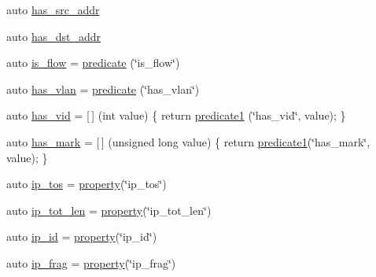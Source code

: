 \begin{DoxyCompactItemize}
\item 
auto \hyperlink{namespacepfq__lang_1_1anonymous__namespace_02default_8hpp_03_aabc75799de679df702f4179ead82114c}{has\+\_\+src\+\_\+addr}
\item 
auto \hyperlink{namespacepfq__lang_1_1anonymous__namespace_02default_8hpp_03_af223a0513ceffa69c0b8535a7cca12da}{has\+\_\+dst\+\_\+addr}
\item 
auto \hyperlink{namespacepfq__lang_1_1anonymous__namespace_02default_8hpp_03_a32aab6804e2daac2458f7c050ed69cf1}{is\+\_\+flow} = \hyperlink{namespacepfq__lang_abd58b2244ff8b0775a3b5865bc128872}{predicate} (\char`\"{}is\+\_\+flow\char`\"{})
\item 
auto \hyperlink{namespacepfq__lang_1_1anonymous__namespace_02default_8hpp_03_a30a0c8d9bcd28cd17c6c1699c3339c3f}{has\+\_\+vlan} = \hyperlink{namespacepfq__lang_abd58b2244ff8b0775a3b5865bc128872}{predicate} (\char`\"{}has\+\_\+vlan\char`\"{})
\item 
auto \hyperlink{namespacepfq__lang_1_1anonymous__namespace_02default_8hpp_03_adddd2dea56164719f2853af158911a80}{has\+\_\+vid} = \mbox{[}$\,$\mbox{]} (int value) \{ return \hyperlink{namespacepfq__lang_ae23a03cee94b5ddfde4a8d2e5c521f0e}{predicate1} (\char`\"{}has\+\_\+vid\char`\"{}, value); \}
\item 
auto \hyperlink{namespacepfq__lang_1_1anonymous__namespace_02default_8hpp_03_a0f9dc3f39bf9793e766b6312718483f1}{has\+\_\+mark} = \mbox{[}$\,$\mbox{]} (unsigned long value) \{ return \hyperlink{namespacepfq__lang_ae23a03cee94b5ddfde4a8d2e5c521f0e}{predicate1}(\char`\"{}has\+\_\+mark\char`\"{}, value); \}
\item 
auto \hyperlink{namespacepfq__lang_1_1anonymous__namespace_02default_8hpp_03_afc29e9877341008196788bba2bde3e04}{ip\+\_\+tos} = \hyperlink{namespacepfq__lang_ad70b40071ed0fd32c05ab8e82bbfec61}{property}(\char`\"{}ip\+\_\+tos\char`\"{})
\item 
auto \hyperlink{namespacepfq__lang_1_1anonymous__namespace_02default_8hpp_03_a172d424ed5943dda09a80d7c63be9490}{ip\+\_\+tot\+\_\+len} = \hyperlink{namespacepfq__lang_ad70b40071ed0fd32c05ab8e82bbfec61}{property}(\char`\"{}ip\+\_\+tot\+\_\+len\char`\"{})
\item 
auto \hyperlink{namespacepfq__lang_1_1anonymous__namespace_02default_8hpp_03_a7e1fd2e2131451ca8afe2f8ab07b97a8}{ip\+\_\+id} = \hyperlink{namespacepfq__lang_ad70b40071ed0fd32c05ab8e82bbfec61}{property}(\char`\"{}ip\+\_\+id\char`\"{})
\item 
auto \hyperlink{namespacepfq__lang_1_1anonymous__namespace_02default_8hpp_03_a29f207a5d209c3968f5d2e8f3c19c239}{ip\+\_\+frag} = \hyperlink{namespacepfq__lang_ad70b40071ed0fd32c05ab8e82bbfec61}{property}(\char`\"{}ip\+\_\+frag\char`\"{})

\end{DoxyCompactItemize}

